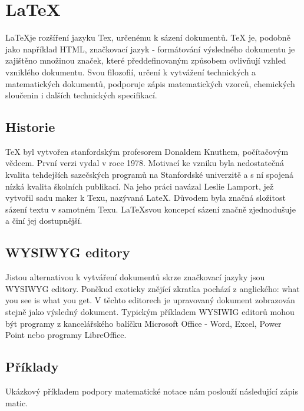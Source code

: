 \documentclass[main.tex]{subfiles}
\begin{document}
\section{\LaTeX}
\LaTeX je rozšíření jazyku Tex, určenému k sázení dokumentů. TeX je, podobně jako například HTML, značkovací jazyk - formátování výsledného dokumentu je zajištěno množinou značek, které předdefinovaným způsobem ovlivňují vzhled vzniklého dokumentu. Svou filozofií, určení k vytvážení technických a matematických dokumentů, podporuje zápis matematických vzorců, chemických sloučenin i dalších technických specifikací. 

\subsection{Historie}
TeX byl vytvořen stanfordským profesorem Donaldem Knuthem, počítačovým vědcem. První verzi vydal v roce 1978. Motivací ke vzniku byla nedostatečná kvalita tehdejších sazečských programů na Stanfordské univerzitě a s ní spojená nízká kvalita školních publikací. Na jeho práci navázal Leslie Lamport, jež vytvořil sadu maker k Texu, nazývaná LateX. Důvodem byla značná složitost sázení textu v samotném Texu. \LaTeX svou koncepcí sázení značně zjednodušuje a činí jej dostupnější. 


\subsection{WYSIWYG editory}
Jistou alternativou k vytváření dokumentů skrze značkovací jazyky jsou WYSIWYG editory. Poněkud exoticky znějící zkratka pochází z anglického: what you see is what you get. V těchto editorech je upravovaný dokument zobrazován stejně jako výsledný dokument. Typickým příkladem WYSIWIG editorů mohou být programy z kancelářského balíčku Microsoft Office - Word, Excel, Power Point nebo programy LibreOffice.



\subsection{Příklady}
Ukázkový příkladem podpory matematické notace nám poslouží následující zápis matic.
\end{document}
